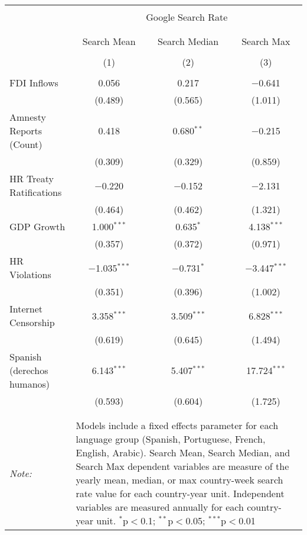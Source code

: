 
\begin{table}[!htbp] \centering 
  \caption{} 
  \label{} 
\begin{tabular}{@{\extracolsep{5pt}}lccc} 
\\[-1.8ex]\hline 
\hline \\[-1.8ex] 
 & \multicolumn{3}{c}{Google Search Rate} \\ 
\cline{2-4} 
\\[-1.8ex] & \multicolumn{3}{c}{ } \\ 
 & Search Mean & Search Median & Search Max \\ 
\\[-1.8ex] & (1) & (2) & (3)\\ 
\hline \\[-1.8ex] 
 FDI Inflows & 0.056 & 0.217 & $-$0.641 \\ 
  & (0.489) & (0.565) & (1.011) \\ 
  Amnesty Reports (Count) & 0.418 & 0.680$^{**}$ & $-$0.215 \\ 
  & (0.309) & (0.329) & (0.859) \\ 
  HR Treaty Ratifications & $-$0.220 & $-$0.152 & $-$2.131 \\ 
  & (0.464) & (0.462) & (1.321) \\ 
  GDP Growth & 1.000$^{***}$ & 0.635$^{*}$ & 4.138$^{***}$ \\ 
  & (0.357) & (0.372) & (0.971) \\ 
  HR Violations & $-$1.035$^{***}$ & $-$0.731$^{*}$ & $-$3.447$^{***}$ \\ 
  & (0.351) & (0.396) & (1.002) \\ 
  Internet Censorship & 3.358$^{***}$ & 3.509$^{***}$ & 6.828$^{***}$ \\ 
  & (0.619) & (0.645) & (1.494) \\ 
  Spanish (derechos humanos) & 6.143$^{***}$ & 5.407$^{***}$ & 17.724$^{***}$ \\ 
  & (0.593) & (0.604) & (1.725) \\ 
 \hline \\[-1.8ex] 
\hline 
\hline \\[-1.8ex] 
\textit{Note:}  & \multicolumn{3}{l}{\parbox[t]{8cm}{Models include a fixed effects parameter for each language group (Spanish, Portuguese, French, English, Arabic). Search Mean, Search Median, and Search Max dependent variables are measure of the yearly mean, median, or max country-week search rate value for each country-year unit. Independent variables are measured annually for each country-year unit. $^{*}$p$<$0.1; $^{**}$p$<$0.05; $^{***}$p$<$0.01}} \\ 
\end{tabular} 
\end{table} 
